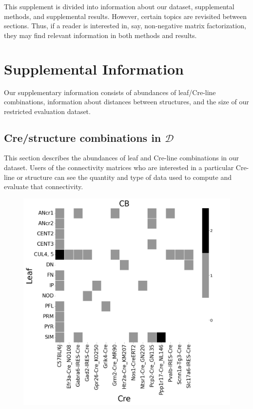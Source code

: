 This supplement is divided into information about our dataset, supplemental methods, and supplemental results.
However, certain topics are revisited between sections.
Thus, if a reader is interested in, say, non-negative matrix factorization, they may find relevant information in both methods and results.

\section{Supplemental Information}
\label{supp_sec:info}

Our supplementary information consists of abundances of leaf/Cre-line combinations, information about distances between structures, and the size of our restricted evaluation dataset.

\subsection{Cre/structure combinations in $\mathcal D$}
\label{supp_sec:data}

This section describes the abundances of leaf and Cre-line combinations in our dataset.
Users of the connectivity matrices who are interested in a particular Cre-line or structure can see the quantity and type of data used to compute and evaluate that connectivity.

\newpage

\begin{figure}[H]
    \centering
    \includegraphics[width = 7in]{figs/CB centroid density.png}
    \label{fig:my_label}
\end{figure}
\newpage

